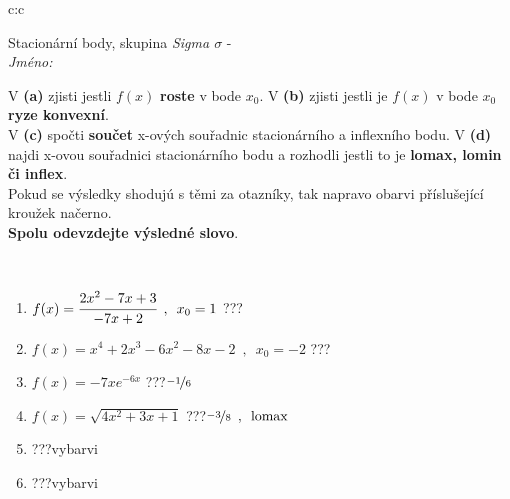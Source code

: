 \documentclass[10pt]{report}
\begin{document}
\newpage
\thispagestyle{empty}
\begin{tabular}{c:c}
\begin{minipage}[c][104.5mm][t]{0.5\linewidth}
\begin{center}
\vspace{7mm}
{\huge Stacionární body, skupina \textit{Sigma $\sigma$} -}\\[5mm]
\textit{Jméno:}\phantom{xxxxxxxxxxxxxxxxxxxxxxxxxxxxxxxxxxxxxxxxxxxxxxxxxxxxxxxxxxxxxxxxx}\\[5mm]
\begin{minipage}{0.95\linewidth}
\begin{center}
{\small V \textbf{(a)} zjisti jestli $f(x)$ \textbf{roste} v bode $x_0$. V \textbf{(b)} zjisti jestli je $f(x)$ v bode $x_0$ \textbf{ryze konvexní}.\\V \textbf{(c)} spočti \textbf{součet} x-ových souřadnic stacionárního a inflexního bodu. V \textbf{(d)} najdi x-ovou souřadnici stacionárního bodu a rozhodli jestli to je \textbf{lomax, lomin či inflex}.\\Pokud se výsledky shodujú s těmi za otazníky, tak napravo obarvi příslušející kroužek načerno.\\\textbf{Spolu odevzdejte výsledné slovo}}.
\end{center}
\end{minipage}
\\[1mm]
\begin{minipage}{0.79\linewidth}
\begin{center}
\begin{varwidth}{\linewidth}
\begin{enumerate}
\normalsize
\item $f(x)=\cfrac{2x^2-7x+3}{-7x+2}\enspace , \enspace x_0=1$\quad \dotfill\; ???\;\dotfill \quad {}
\item $f(x)=x^4+2x^3-6x^2-8x-2\enspace , \enspace x_0=-2$\quad \dotfill\; ???\;\dotfill \quad {}
\item $f(x)=-7xe^{-6x}$\quad \dotfill\; ???\;\dotfill \quad $\nicefrac{-1}{6}$
\item $f(x)=\sqrt{4x^2+3x+1}$\quad \dotfill\; ???\;\dotfill \quad $\nicefrac{-3}{8}\enspace , \enspace\mathrm{lomax}$
\item \quad \dotfill\; ???\;\dotfill \quad vybarvi
\item \quad \dotfill\; ???\;\dotfill \quad vybarvi
\end{enumerate}
\end{varwidth}
\end{center}

\end{minipage}
\end{center}
\end{minipage}
\end{tabular}
\end{document}
